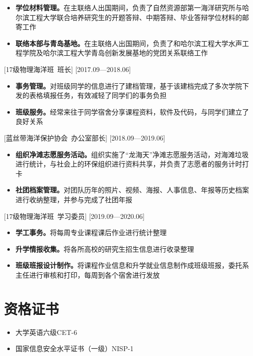 \documentclass{resume}
\begin{document}
\begin{itemize}
  \item \textbf{学位材料管理。}在主联络人出国期间，负责了自然资源部第一海洋研究所与哈尔滨工程大学联合培养研究生的开题答辩、中期答辩、毕业答辩学位材料的邮寄工作
    \item \textbf{联络本部与青岛基地。}在主联络人出国期间，负责了和哈尔滨工程大学水声工程学院及哈尔滨工程大学青岛创新发展基地的党团关系联络工作
\end{itemize}

[17级物理海洋班\ 班长]
[2017.09—2018.06] 

\begin{itemize}
  \item \textbf{事务管理。}对班级同学的信息进行了建档管理，基于该建档完成了多次学院下发的表格填报任务，有效减轻了同学们的事务负担
  \item \textbf{班级服务。}经常来往于同学宿舍分享课程资料，软件及代码，与同学们建立了良好关系
\end{itemize}

[蓝丝带海洋保护协会\ 办公室部长]
[2018.09—2019.06] 

\begin{itemize}
  \item \textbf{组织净滩志愿服务活动。}组织实施了“龙海天”净滩志愿服务活动，对海滩垃圾进行统计，与社会上的环保组织进行资料共享，并负责了志愿者的服务计时打卡
    \item \textbf{社团档案管理。}对团队历年的照片、视频、海报、人事信息、年报等历史档案进行收纳整理，并参与完成了社团年报
\end{itemize}

[17级物理海洋班\ 学习委员]
[2019.09—2020.06] 

\begin{itemize}
  \item \textbf{学工事务。}将每周专业课程课后作业进行统计整理
    \item \textbf{升学情报收集。}将各所高校的研究生招生信息进行收录整理
    \item  \textbf{班级班报设计制作。}将课程作业信息和升学就业信息制作成班级班报，委托系主任进行审核和打印，每周到各个宿舍进行发放
\end{itemize}


\section[资格证书]{资格证书}
\begin{itemize}
  \item {大学英语六级CET-6}
  \item {国家信息安全水平证书（一级）NISP-1}
\end{itemize}
\end{document}
